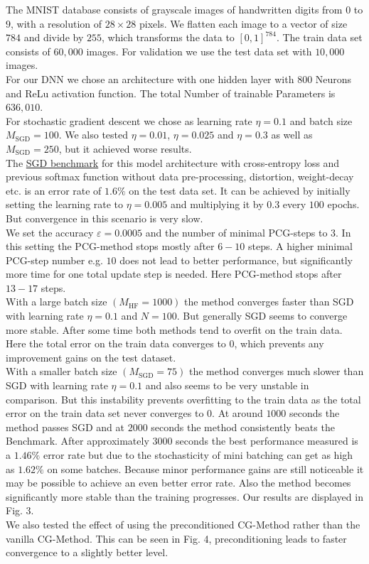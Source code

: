 \documentclass[conference]{IEEEtran}
\begin{document}
\noindent
The MNIST database consists of grayscale images of handwritten digits from $0$ to $9$, with a resolution of $28\times28$ pixels. We flatten each image to a vector of size $784$ and divide by $255$, which transforms the data to $[0,1]^{784}$. The train data set consists of $60,000$ images. For validation we use the test data set with $10,000$ images.\\
For our DNN we chose an architecture with one hidden layer with $800$ Neurons and ReLu activation function. The total Number of trainable Parameters is $636,010$.\\
For stochastic gradient descent we chose as learning rate $\eta=0.1$ and batch size $M_{\mathrm{SGD}}=100$. We also tested $\eta=0.01$, $\eta=0.025$ and $\eta=0.3$ as well as $M_{\mathrm{SGD}}=250$, but it achieved worse results. \\
The \href{https://en.wikipedia.org/wiki/MNIST_database}{SGD benchmark} for this model architecture with cross-entropy loss and previous softmax function without data pre-processing, distortion, weight-decay etc. is an error rate of $1.6\%$ on the test data set.
It can be achieved by initially setting the learning rate to $\eta=0.005$ and multiplying it by $0.3$ every $100$ epochs. But convergence in this scenario is very slow.\\
\noindent
We set the accuracy $\varepsilon=0.0005$ and the number of minimal PCG-steps to $3$. In this setting the PCG-method stops mostly after $6-10$ steps. A higher minimal PCG-step number e.g. $10$ does not lead to better performance, but significantly more time for one total update step is needed. Here PCG-method stops after $13-17$ steps.\\
With a large batch size $(M_{\mathrm{HF}}=1000)$ the method converges faster than SGD with learning rate $\eta=0.1$ and $N=100.$ But generally SGD seems to converge more stable. After some time both methods tend to overfit on the train data. Here the total error on the train data converges to $0$, which prevents any improvement gains on the test dataset.\\
With a smaller batch size $(M_{\mathrm{SGD}}=75)$ the method converges much slower than SGD with learning rate $\eta=0.1$ and also seems to be very unstable in comparison. But this instability prevents overfitting to the train data as the total error on the train data set never converges to $0$. At around $1000$ seconds the method passes SGD and at $2000$ seconds the method consistently beats the Benchmark. After approximately $3000$ seconds the best performance measured is a $1.46\%$ error rate but due to the stochasticity of mini batching can get as high as $1.62\%$ on some batches. Because minor performance gains are still noticeable it may be possible to achieve an even better error rate.
Also the method becomes significantly more stable than the training progresses. Our results are displayed in Fig. 3.\\
We also tested the effect of using the preconditioned CG-Method rather than the vanilla CG-Method. This can be seen in Fig. 4, preconditioning leads to faster convergence to a slightly better level.
\end{document}
